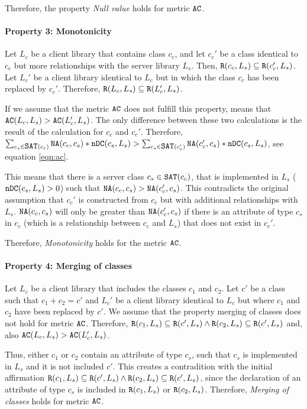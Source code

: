  Therefore, the property \textit{Null value} holds for metric $\verb|AC|$.

\paragraph{Property 3: Monotonicity}
Let $L_c$ be a client library that contains class $c_c$, and let $c_c'$ be a class identical to $c_c$ but more relationships with the server library $L_s$. Then, $\verb|R|(c_c, L_s) \subseteq \verb|R|(c_c', L_s)$. Let $L_c'$ be a client library identical to $L_c$ but in which the class $c_c$ has been replaced by $c_c'$. Therefore, $\verb|R|(L_c, L_s) \subseteq \verb|R|(L_c', L_s)$.

If we assume that the metric $\verb|AC|$ does not fulfill this property, means that $\verb|AC|(L_c, L_s) > \verb|AC|(L_c', L_s)$. The only difference between these two calculations is the result of the calculation for $c_c$ and $c_c'$. Therefore, $\sum_{c_s \in \verb|SAT|(c_c)} \verb|NA|(c_c, c_s) * \verb|nDC|(c_s, L_s) > \sum_{c_s \in \verb|SAT|(c_c')} \verb|NA|(c_c', c_s) * \verb|nDC|(c_s, L_s)$, see equation \ref{eqn:ac}.

This means that there is a server class $c_s \in \verb|SAT|(c_c)$, that is implemented in $L_s$ ($\verb|nDC|(c_s, L_s) > 0$) such that $\verb|NA|(c_c, c_s) > \verb|NA|(c_c', c_s)$. This contradicts the original assumption that $c_c'$ is constructed from $c_c$ but with additional relationships with $L_s$. $\verb|NA|(c_c, c_s)$ will only be greater than $\verb|NA|(c_c', c_s)$ if there is an attribute of type $c_s$ in $c_c$ (which is a relationship between $c_c$ and $L_s$) that does not exist in $c_c'$.

Therefore, \textit{Monotonicity} holds for the metric $\verb|AC|$.

\paragraph{Property 4: Merging of classes}
Let $L_c$ be a client library that includes the classes $c_1$ and $c_2$. Let $c'$ be a class such that $c_1 + c_2 = c'$ and $L_c'$ be a client library identical to $L_c$ but where $c_1$ and $c_2$ have been replaced by $c'$. We assume that the property merging of classes does not hold for metric $\verb|AC|$. Therefore, $\verb|R|(c_1, L_s) \subseteq \verb|R|(c', L_s) \land \verb|R|(c_2, L_s) \subseteq \verb|R|(c', L_s)$ and, also $\verb|AC|(L_c, L_s) > \verb|AC|(L_c', L_s)$.

Thus, either $c_1$ or $c_2$ contain an attribute of type $c_s$, such that $c_s$ is implemented in $L_s$ and it is not included $c'$. This creates a contradition with the initial affirmation $\verb|R|(c_1, L_s) \subseteq \verb|R|(c', L_s) \land \verb|R|(c_2, L_s) \subseteq \verb|R|(c', L_s)$, since the declaration of an attribute of type $c_s$ is included in $\verb|R|(c_1, L_s)$ or $\verb|R|(c_2, L_s)$. Therefore, \textit{Merging of classes} holds for metric $\verb|AC|$.

